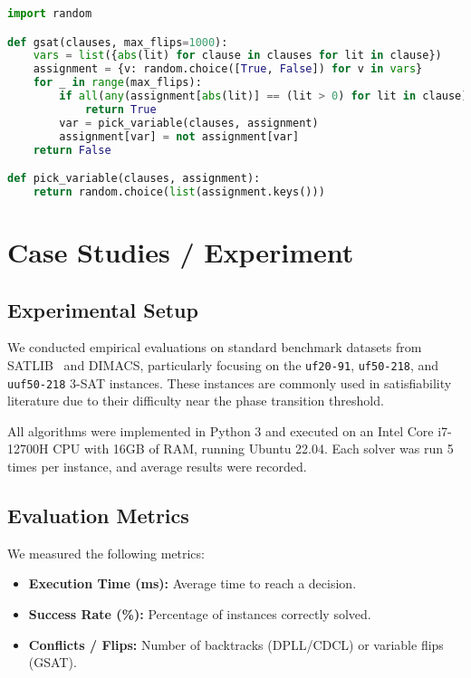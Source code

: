 \documentclass[11pt]{article}
\begin{document}
\begin{lstlisting}[language=Python, caption=GSAT Algorithm]
import random

def gsat(clauses, max_flips=1000):
    vars = list({abs(lit) for clause in clauses for lit in clause})
    assignment = {v: random.choice([True, False]) for v in vars}
    for _ in range(max_flips):
        if all(any(assignment[abs(lit)] == (lit > 0) for lit in clause) for clause in clauses):
            return True
        var = pick_variable(clauses, assignment)
        assignment[var] = not assignment[var]
    return False

def pick_variable(clauses, assignment):
    return random.choice(list(assignment.keys()))
\end{lstlisting}


\section{Case Studies / Experiment}

\subsection*{Experimental Setup}

We conducted empirical evaluations on standard benchmark datasets from SATLIB~\cite{satlib} and DIMACS, particularly focusing on the \texttt{uf20-91}, \texttt{uf50-218}, and \texttt{uuf50-218} 3-SAT instances. These instances are commonly used in satisfiability literature due to their difficulty near the phase transition threshold.

All algorithms were implemented in Python 3 and executed on an Intel Core i7-12700H CPU with 16GB of RAM, running Ubuntu 22.04. Each solver was run 5 times per instance, and average results were recorded.

\subsection*{Evaluation Metrics}

We measured the following metrics:
\begin{itemize}
  \item \textbf{Execution Time (ms):} Average time to reach a decision.
  \item \textbf{Success Rate (\%):} Percentage of instances correctly solved.
  \item \textbf{Conflicts / Flips:} Number of backtracks (DPLL/CDCL) or variable flips (GSAT).
\end{itemize}
\end{document}
